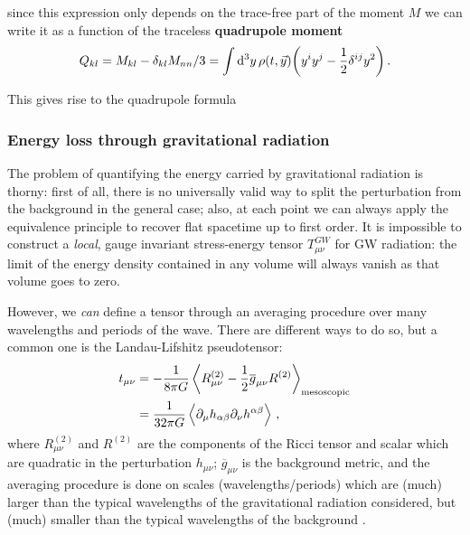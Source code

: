 \documentclass[main.tex]{subfiles}
\begin{document}
since this expression only depends on the trace-free part of the moment \(M\) we can write it as a function of the traceless \textbf{quadrupole moment} 
%
\begin{align} \label{eq:quadrupole}
Q_{kl} = M_{kl} - \delta_{kl} M_{nn} / 3
= \int \dd[3]{y} \rho (t, \vec{y}) \qty(y^{i } y^{j} - \frac{1}{2} \delta^{ij} y^2)
\,.
\end{align}

This gives rise to the quadrupole formula 
%

\subsubsection{Energy loss through gravitational radiation}

The problem of quantifying the energy carried by gravitational radiation is thorny: first of all, there is no universally valid way to split the perturbation from the background in the general case; also, at each point we can always apply the equivalence principle to recover flat spacetime up to first order. 
It is impossible to construct a \emph{local}, gauge invariant stress-energy tensor \(T_{\mu \nu }^{GW}\) for \ac{GW} radiation: the limit of the energy density contained in any volume will always vanish as that volume goes to zero. 

However, we \emph{can} define a tensor through an averaging procedure over many wavelengths and periods of the wave. There are different ways to do so, but a common one is the Landau-Lifshitz pseudotensor: 
%
\begin{align}
t_{\mu \nu } &= - \frac{1}{8 \pi G} \expval{R^{(2)}_{\mu \nu }- \frac{1}{2} \overline{g}_{\mu \nu } R^{(2)}}_{\text{mesoscopic}}  \\
&= \frac{1}{32 \pi G} \expval{\partial_{\mu } h_{\alpha \beta } \partial_{\nu }h^{\alpha \beta }}
\,,
\end{align}
%
where \(R^{(2)}_{\mu \nu }\) and \(R^{(2)}\) are the components of the Ricci tensor and scalar which are quadratic in the perturbation \(h_{\mu \nu }\); \(\overline{g}_{\mu \nu }\) is the background metric, and the averaging procedure is done on scales (wavelengths/periods) which are (much) larger than the typical wavelengths of the gravitational radiation considered, but (much) smaller than the typical wavelengths of the background \cite[sections 1.4.2, 1.4.3]{maggioreGravitationalWavesVolume2007}.
\end{document}
